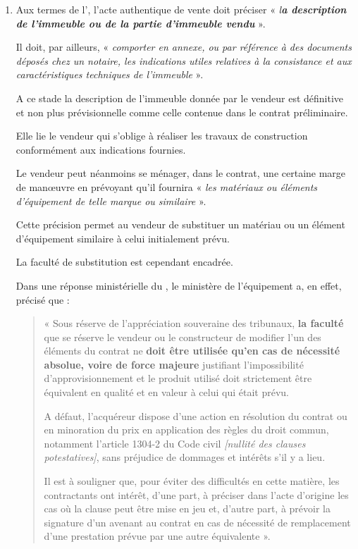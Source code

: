 				\begin{enumerate}
					\item Aux termes de l', l'acte authentique de vente doit préciser « \emph{l\textbf{a description de l'immeuble ou de la partie d'immeuble vendu}} ».

					\medbreak Il doit, par ailleurs, « \emph{comporter en annexe, ou par référence à des documents déposés chez un notaire, les indications utiles relatives à la consistance et aux caractéristiques techniques de l'immeuble} ».

					A ce stade la description de l’immeuble donnée par le vendeur est définitive et non plus prévisionnelle comme celle contenue dans le contrat préliminaire.

					Elle lie le vendeur qui s’oblige à réaliser les travaux de construction conformément aux indications fournies.

					Le vendeur peut néanmoins se ménager, dans le contrat, une certaine marge de manœuvre en prévoyant qu’il fournira « \emph{les matériaux ou éléments d’équipement de telle marque ou similaire} ».

					Cette précision permet au vendeur de substituer un matériau ou un élément d’équipement similaire à celui initialement prévu.

					La faculté de substitution est cependant encadrée.

					Dans une réponse ministérielle  du , le ministère de l’équipement a, en effet, précisé que :

					\begin{quote}
						« Sous réserve de l'appréciation souveraine des tribunaux, \textbf{la faculté} que se réserve le vendeur ou le constructeur de modifier l'un des éléments du contrat ne \textbf{doit être utilisée qu'en cas de nécessité absolue, voire de force majeure} justifiant l'impossibilité d'approvisionnement et le produit utilisé doit strictement être équivalent en qualité et en valeur à celui qui était prévu.

						A défaut, l'acquéreur dispose d'une action en résolution du contrat ou en minoration du prix en application des règles du droit commun, notamment l'article 1304-2 du Code civil \emph{[nullité des clauses potestatives]}, sans préjudice de dommages et intérêts s'il y a lieu.

						Il est à souligner que, pour éviter des difficultés en cette matière, les contractants ont intérêt, d'une part, à préciser dans l'acte d'origine les cas où la clause peut être mise en jeu et, d'autre part, à prévoir la signature d'un avenant au contrat en cas de nécessité de remplacement d'une prestation prévue par une autre équivalente ».
					\end{quote}


\end{enumerate}
